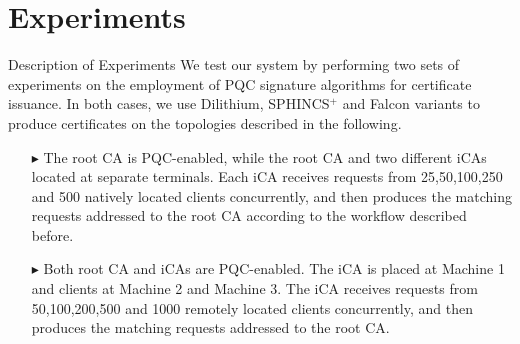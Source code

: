 \documentclass[10pt]{beamer}
\begin{document}
\section{Experiments}
\begin{frame}{Description of Experiments}
	We test our system by performing two sets of experiments on the employment of PQC signature algorithms for certificate issuance. In both cases, we use Dilithium, SPHINCS$^+$ and Falcon variants to produce certificates on the topologies described in the following.  
	
	\begin{itemize}
		\item[$\blacktriangleright$] The root CA is PQC-enabled, while the root CA and two different iCAs located at separate terminals. Each iCA receives requests from 25,50,100,250 and 500 natively located clients concurrently, and then produces the matching requests addressed to the root CA according to the workflow described before.
		\item[$\blacktriangleright$] Both root CA and iCAs are PQC-enabled. The iCA is placed at Machine 1 and clients at Machine 2 and Machine 3. The iCA receives requests from 50,100,200,500 and 1000 remotely located clients concurrently, and then produces the matching requests addressed to the root CA. 
	\end{itemize}

\end{frame}	
\end{document}
